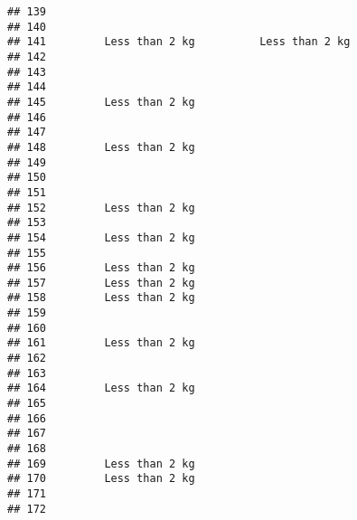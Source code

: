 \documentclass[
]{article}
\begin{document}
\begin{verbatim}
## 139                                                                      
## 140                                                                      
## 141         Less than 2 kg          Less than 2 kg                       
## 142                                                                      
## 143                                                                      
## 144                                                                      
## 145         Less than 2 kg                                               
## 146                                                                      
## 147                                                                      
## 148         Less than 2 kg                                               
## 149                                                                      
## 150                                                                      
## 151                                                                      
## 152         Less than 2 kg                                               
## 153                                                                      
## 154         Less than 2 kg                                               
## 155                                                                      
## 156         Less than 2 kg                                               
## 157         Less than 2 kg                                               
## 158         Less than 2 kg                                               
## 159                                                                      
## 160                                                                      
## 161         Less than 2 kg                                               
## 162                                                                      
## 163                                                                      
## 164         Less than 2 kg                                               
## 165                                                                      
## 166                                                                      
## 167                                                                      
## 168                                                                      
## 169         Less than 2 kg                                               
## 170         Less than 2 kg                                               
## 171                                                                      
## 172                                                                      

\end{verbatim}
\end{document}
